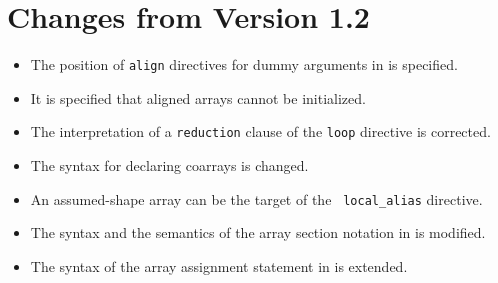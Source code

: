 \section{Changes from Version 1.2}

\begin{itemize}
  \item The position of {\tt align} directives for dummy arguments
		in {\XMPC} is specified.
  \item It is specified that aligned arrays cannot be initialized.
  \item The interpretation of a {\tt reduction} clause of the {\tt loop}
		directive is corrected.
  \item The syntax for declaring coarrays is changed.
  \item An assumed-shape array can be the target of the {\tt
		local\_alias} directive.
  \item The syntax and the semantics of the array section notation in
		{\XMPC} is modified.
  \item The syntax of the array assignment statement in {\XMPC} is
		extended.
\end{itemize}


\cleardoublepage

